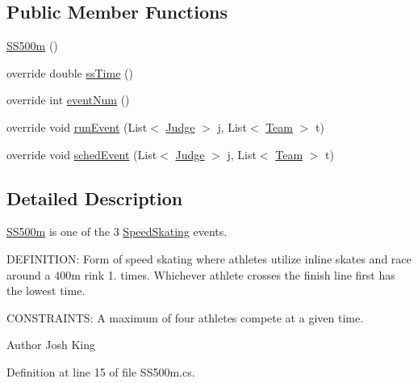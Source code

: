 \subsection*{Public Member Functions}
\begin{DoxyCompactItemize}
\item 
\hyperlink{classPCO_1_1SS500m_a052125293177cecfa650435ac5decb38}{S\+S500m} ()
\item 
override double \hyperlink{classPCO_1_1SS500m_a57b859e56912c44aee51ac2854f5ce9c}{ss\+Time} ()
\item 
override int \hyperlink{classPCO_1_1SS500m_a909b7bee200b907aae35d8bc47d442e5}{event\+Num} ()
\item 
override void \hyperlink{classPCO_1_1SS500m_a3ebc360a0ec5c60e1d2c66511c8f8025}{run\+Event} (List$<$ \hyperlink{classPCO_1_1Judge}{Judge} $>$ j, List$<$ \hyperlink{classPCO_1_1Team}{Team} $>$ t)
\item 
override void \hyperlink{classPCO_1_1SS500m_a760bbe2b60121e4fe86c64f2c8b60848}{sched\+Event} (List$<$ \hyperlink{classPCO_1_1Judge}{Judge} $>$ j, List$<$ \hyperlink{classPCO_1_1Team}{Team} $>$ t)
\end{DoxyCompactItemize}


\subsection{Detailed Description}
\hyperlink{classPCO_1_1SS500m}{S\+S500m} is one of the 3 \hyperlink{classPCO_1_1SpeedSkating}{Speed\+Skating} events. 

D\+E\+F\+I\+N\+I\+T\+I\+O\+N\+: Form of speed skating where athletes utilize inline skates and race around a 400m rink 1. times. Whichever athlete crosses the finish line first has the lowest time.

C\+O\+N\+S\+T\+R\+A\+I\+N\+T\+S\+: A maximum of four athletes compete at a given time.\begin{DoxyAuthor}{Author}
Josh King 
\end{DoxyAuthor}


Definition at line 15 of file S\+S500m.\+cs.



